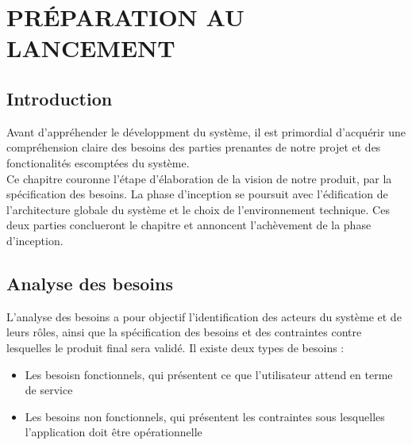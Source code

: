 \setcounter{chapter}{2}
\chapter{          PRÉPARATION AU LANCEMENT}
\minitoc %
\graphicspath{{Chapitre3/figures/}}


\pagestyle{fancy}
\fancyhf{}
\fancyhead[R]{\bfseries\rightmark}
\fancyfoot[R]{\thepage}
\renewcommand{\headrulewidth}{0.5pt}
\renewcommand{\footrulewidth}{0pt}
\renewcommand{\chaptermark}[1]{\markboth{\MakeUppercase{\chaptername~\thechapter. #1 }}{}}
\renewcommand{\sectionmark}[1]{\markright{\thechapter.\thesection~ #1}}

\begin{spacing}{1.5}

\section*{Introduction}
Avant d'appréhender le développment du système, il est primordial d'acquérir une compréhension claire des besoins des parties prenantes de notre projet et des fonctionalités escomptées du système.\\
Ce chapitre couronne l'étape d'élaboration de la vision de notre produit, par la spécification des besoins. La phase d'inception se poursuit avec l'édification de l'architecture globale du système et le choix de l'environnement technique. Ces deux parties conclueront le chapitre et annoncent l'achèvement de la phase d'inception.

\section{Analyse des besoins}
L'analyse des besoins a pour objectif l'identification des acteurs du système et de leurs rôles, ainsi que la spécification des besoins et des contraintes contre lesquelles le produit final sera validé. Il existe deux types de besoins :
\begin{itemize}
    \item Les besoisn fonctionnels, qui présentent ce que l'utilisateur attend en terme de service
    \item Les besoins non fonctionnels, qui présentent les contraintes sous lesquelles l'application doit être opérationnelle
\end{itemize}


\end{spacing}
